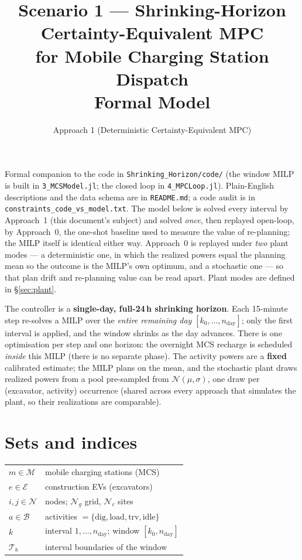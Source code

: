 \documentclass[11pt]{article}
\title{Scenario 1 --- Shrinking-Horizon Certainty-Equivalent MPC\\
       for Mobile Charging Station Dispatch\\[2pt]
       \large Formal Model}
\author{Approach 1 (Deterministic Certainty-Equivalent MPC)}
\date{}
\begin{document}
\maketitle

Formal companion to the code in \texttt{Shrinking\_Horizon/code/} (the window MILP is
built in \texttt{3\_MCSModel.jl}; the closed loop in \texttt{4\_MPCLoop.jl}). Plain-English
descriptions and the data schema are in \texttt{README.md}; a code audit is in
\texttt{constraints\_code\_vs\_model.txt}. The model below is solved every interval by
Approach~1 (this document's subject) and solved \emph{once}, then replayed open-loop, by
Approach~0, the one-shot baseline used to measure the value of re-planning; the MILP
itself is identical either way. Approach~0 is replayed under \emph{two} plant modes --- a
deterministic one, in which the realized powers equal the planning mean so the outcome is the
MILP's own optimum, and a stochastic one --- so that plan drift and re-planning value can be
read apart. Plant modes are defined in \S\ref{sec:plant}.

The controller is a \textbf{single-day, full-24\,h shrinking horizon}. Each 15-minute step
re-solves a MILP over the \emph{entire remaining day} $[k_0,\dots,n_{\text{day}}]$; only the
first interval is applied, and the window shrinks as the day advances. There is one
optimisation per step and one horizon: the overnight MCS recharge is scheduled \emph{inside}
this MILP (there is no separate phase). The activity powers are a \textbf{fixed} calibrated
estimate; the MILP plans on the mean, and the stochastic plant draws realized powers from a
pool pre-sampled from $\mathcal{N}(\mu,\sigma)$, one draw per (excavator, activity) occurrence
(shared across every approach that simulates the plant, so their realizations are comparable).

\section{Sets and indices}
\begin{tabular}{ll}
$m \in \mathcal{M}$ & mobile charging stations (MCS) \\
$e \in \mathcal{E}$ & construction EVs (excavators) \\
$i,j \in \mathcal{N}$ & nodes; $\mathcal{N}_g$ grid, $\mathcal{N}_c$ sites \\
$a \in \mathcal{B}$ & activities $=\{\text{dig},\text{load},\text{trv},\text{idle}\}$ \\
$k$ & interval $1,\dots,n_{\text{day}}$; window $[k_0,n_{\text{day}}]$ \\
$\mathcal{T}_b$ & interval boundaries of the window \\
\end{tabular}
\end{document}
